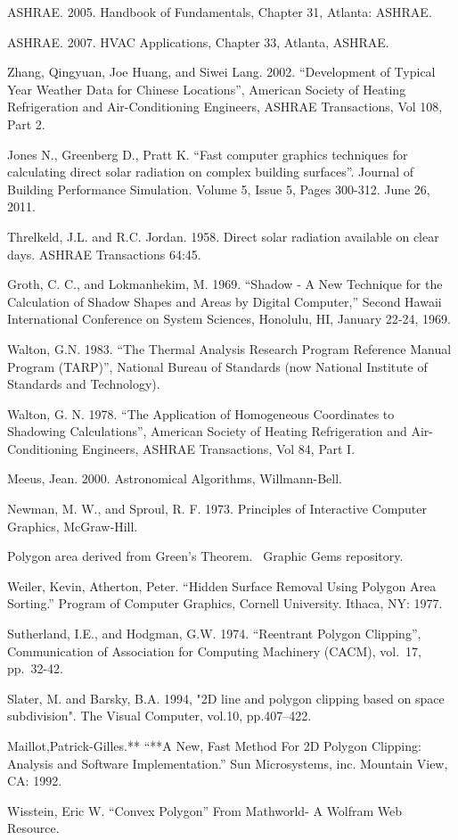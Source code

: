 ASHRAE. 2005. Handbook of Fundamentals, Chapter 31, Atlanta: ASHRAE.

ASHRAE. 2007. HVAC Applications, Chapter 33, Atlanta, ASHRAE.

Zhang, Qingyuan, Joe Huang, and Siwei Lang. 2002. ``Development of Typical Year Weather Data for Chinese Locations'', American Society of Heating Refrigeration and Air-Conditioning Engineers, ASHRAE Transactions, Vol 108, Part 2.

Jones N., Greenberg D., Pratt K. ``Fast computer graphics techniques for calculating direct solar radiation on complex building surfaces''. Journal of Building Performance Simulation. Volume 5, Issue 5, Pages 300-312. June 26, 2011.

Threlkeld, J.L. and R.C. Jordan. 1958. Direct solar radiation available on clear days. ASHRAE Transactions 64:45.

Groth, C. C., and Lokmanhekim, M. 1969. ``Shadow ‑ A New Technique for the Calculation of Shadow Shapes and Areas by Digital Computer,'' Second Hawaii International Conference on System Sciences, Honolulu, HI, January 22‑24, 1969.

Walton, G.N. 1983. ``The Thermal Analysis Research Program Reference Manual Program (TARP)'', National Bureau of Standards (now National Institute of Standards and Technology).

Walton, G. N. 1978. ``The Application of Homogeneous Coordinates to Shadowing Calculations'', American Society of Heating Refrigeration and Air-Conditioning Engineers, ASHRAE Transactions, Vol 84, Part I.

Meeus, Jean. 2000. Astronomical Algorithms, Willmann-Bell.

Newman, M. W., and Sproul, R. F. 1973. Principles of Interactive Computer Graphics, McGraw‑Hill.

Polygon area derived from Green's Theorem.~ Graphic Gems repository.

Weiler, Kevin, Atherton, Peter. ``Hidden Surface Removal Using Polygon Area Sorting.'' Program of Computer Graphics, Cornell University. Ithaca, NY: 1977.

Sutherland, I.E., and Hodgman, G.W. 1974. ``Reentrant Polygon Clipping'', Communication of Association for Computing Machinery (CACM), vol.~17, pp.~32-42.

Slater, M. and Barsky, B.A. 1994, "2D line and polygon clipping based on space subdivision". The Visual Computer, vol.10, pp.407–422.

Maillot,Patrick-Gilles.** ``**A New, Fast Method For 2D Polygon Clipping: Analysis and Software Implementation.'' Sun Microsystems, inc. Mountain View, CA: 1992.

Wisstein, Eric W. ``Convex Polygon'' From Mathworld- A Wolfram Web Resource.
